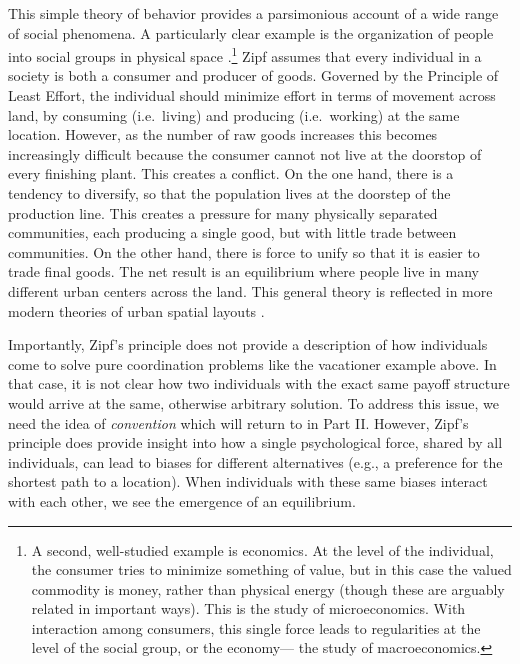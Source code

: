 \documentclass[man, noapacite, 12pt]{apa2}
\begin{document}
This simple theory of behavior provides a parsimonious account of a wide range of social phenomena. A particularly clear example is the organization of people into social  groups in physical space \cite{zipf1949human}.\footnote{A second, well-studied example is economics. At the level of the individual, the consumer tries to minimize something of value, but in this case the valued commodity is money, rather than physical energy (though these are arguably related in important ways). This is the study of microeconomics. With interaction among consumers, this single force leads to regularities at the level of the social group, or the economy--- the study of macroeconomics.} Zipf assumes that every individual in a society is both a consumer and producer of goods. Governed by the Principle of Least Effort, the individual should minimize effort in terms of movement across land, by consuming (i.e.\ living) and producing (i.e.\ working) at the same location. However, as the number of raw goods increases this becomes increasingly difficult because the consumer cannot not live at the doorstop of every finishing plant. This creates a conflict. On the one hand, there is a tendency to diversify, so that the population lives at the doorstep of the production line. This creates a pressure for many physically separated communities, each producing a single good, but with little trade between communities. On the other hand, there is force to unify so that it is easier to trade final goods. The net result is an equilibrium where people live in many different urban centers across the land. This general theory is reflected in more modern theories of urban spatial layouts \cite{mills1967aggregative, brueckner1987structure}.

Importantly, Zipf's principle does not provide a description of how individuals come to solve pure coordination problems like the vacationer example above. In that case, it is not clear how two individuals with the exact same payoff structure would arrive at the same, otherwise arbitrary solution. To address this issue, we need the idea of {\it convention} which will return to in Part II. However, Zipf's principle does provide insight into how a single psychological force, shared by all individuals, can lead to biases for different alternatives (e.g., a preference for the shortest path to a location). When individuals with these same biases interact with each other, we see the emergence of an equilibrium. 
\end{document}
